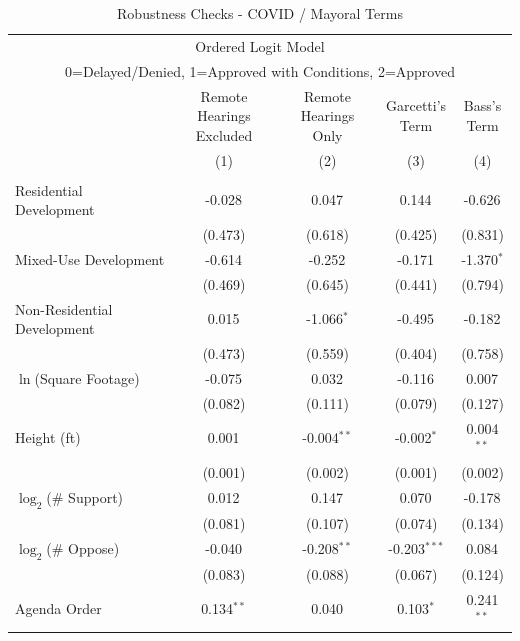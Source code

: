\begin{table}[H]
\centering
\caption{Robustness Checks - COVID / Mayoral Terms}
\vspace{0.2cm}
\label{tab_ologit_covid}
\begin{adjustbox}{max height=0.42\textheight}
\begin{threeparttable}
\begin{tabular}{lcccc}
\multicolumn{5}{c}{Ordered Logit Model} \\
\multicolumn{5}{c}{0=Delayed/Denied, 1=Approved with Conditions, 2=Approved} \\
\toprule
 & \makecell{Remote Hearings\\Excluded} & \makecell{Remote Hearings\\Only} & \makecell{Garcetti's\\Term} & \makecell{Bass's\\Term} \\
 & (1) & (2) & (3) & (4) \\
\midrule
 &  &  &  &  \\
Residential Development  & -0.028$^{}$ & 0.047$^{}$ & 0.144$^{}$ & -0.626$^{}$ \\
 & (0.473) & (0.618) & (0.425) & (0.831) \\ [1.8ex]
Mixed-Use Development  & -0.614$^{}$ & -0.252$^{}$ & -0.171$^{}$ & -1.370$^{*}$ \\
 & (0.469) & (0.645) & (0.441) & (0.794) \\ [1.8ex]
Non-Residential Development  & 0.015$^{}$ & -1.066$^{*}$ & -0.495$^{}$ & -0.182$^{}$ \\
 & (0.473) & (0.559) & (0.404) & (0.758) \\ [1.8ex]
$\ln$(Square Footage)  & -0.075$^{}$ & 0.032$^{}$ & -0.116$^{}$ & 0.007$^{}$ \\
 & (0.082) & (0.111) & (0.079) & (0.127) \\ [1.8ex]
Height (ft)  & 0.001$^{}$ & -0.004$^{**}$ & -0.002$^{*}$ & 0.004$^{**}$ \\
 & (0.001) & (0.002) & (0.001) & (0.002) \\ [1.8ex]
$\log_2$(\# Support)  & 0.012$^{}$ & 0.147$^{}$ & 0.070$^{}$ & -0.178$^{}$ \\
 & (0.081) & (0.107) & (0.074) & (0.134) \\ [1.8ex]
$\log_2$(\# Oppose)  & -0.040$^{}$ & -0.208$^{**}$ & -0.203$^{***}$ & 0.084$^{}$ \\
 & (0.083) & (0.088) & (0.067) & (0.124) \\ [1.8ex]
Agenda Order  & 0.134$^{**}$ & 0.040$^{}$ & 0.103$^{*}$ & 0.241$^{**}$ \\

\end{tabular}
\end{threeparttable}
\end{adjustbox}
\end{table}
